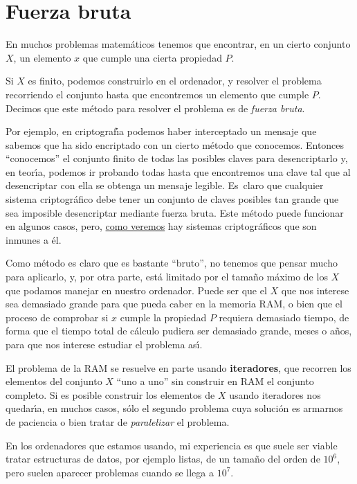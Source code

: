 \section{Fuerza bruta}\label{bruta}

En muchos problemas matem\'aticos  tenemos
que encontrar, en un cierto conjunto $X$, un elemento $x$ que cumple una
cierta propiedad $P$. 

Si $X$ es finito, podemos construirlo en el ordenador,  y resolver el problema
recorriendo el conjunto hasta que encontremos un elemento que cumple $P$.
Decimos que este m\'etodo para resolver el problema es de {\itshape fuerza
bruta}. 

Por ejemplo, en criptograf\'{\i}a podemos haber interceptado un mensaje que
sabemos que ha sido encriptado con un cierto m\'etodo que conocemos. Entonces
``conocemos'' el conjunto finito de todas las posibles claves para
desencriptarlo
y, en teor\'{\i}a, podemos ir probando todas hasta que encontremos  una clave
tal que al desencriptar con ella se obtenga un mensaje legible. Es~claro que
cualquier sistema criptogr\'afico debe tener un conjunto de claves posibles tan
grande que sea imposible desencriptar mediante fuerza bruta. Este m\'etodo puede
funcionar en algunos casos, pero, \hyperref[onetime]{como veremos} hay sistemas
criptogr\'aficos que son inmunes a \'el.


Como m\'etodo es claro que es bastante ``bruto'', no tenemos que pensar mucho
para aplicarlo, y,  por otra parte, est\'a limitado por el tama\~no m\'aximo de
los $X$ que podamos manejar en nuestro ordenador. Puede ser que el $X$ que nos
interese sea demasiado grande para que pueda caber en la memoria RAM, o bien que
el proceso de comprobar si $x$ cumple la propiedad $P$ requiera demasiado
tiempo, de forma que el tiempo total de c\'alculo pudiera ser demasiado grande,
meses o a\~nos,  para que nos interese estudiar el problema as\'{\i}.


El problema de la RAM se resuelve en parte usando {\bf iteradores}, que recorren
los elementos del conjunto $X$ ``uno a uno'' sin construir en RAM el conjunto
completo. Si es posible construir los elementos de $X$ usando iteradores nos
quedar\'{\i}a, en muchos casos, s\'olo el segundo problema cuya soluci\'on es
armarnos de paciencia o bien tratar de {\itshape paralelizar} el problema.

En los ordenadores que estamos usando, mi experiencia es que suele ser viable
tratar estructuras de datos, por ejemplo listas, de un tama\~no del orden de
$10^6$, pero suelen aparecer problemas cuando se llega a $10^7$.



